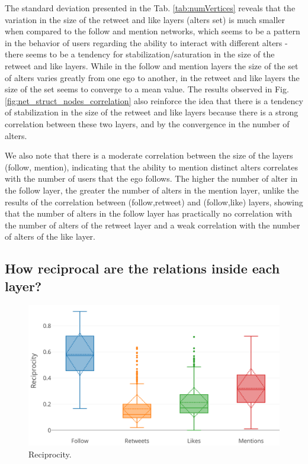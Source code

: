 The standard deviation presented in the Tab. \ref{tab:numVertices} reveals that the variation in the size of the retweet and like layers (alters set) is much smaller when compared to the follow and mention networks, which seems to be a pattern in the behavior of users regarding the ability to interact with different alters - there seems to be a tendency for stabilization/saturation in the size of the retweet and like layers. While in the follow and mention layers the size of the set of alters varies greatly from one ego to another, in the retweet and like layers the size of the set seems to converge to a mean value. The results observed in Fig. \ref{fig:net_struct_nodes_correlation} also reinforce the idea that there is a tendency of stabilization in the size of the retweet and like layers because there is a strong correlation between these two layers, and by the convergence in the number of alters.

We also note that there is a moderate correlation between the size of the layers (follow, mention), indicating that the ability to mention distinct alters correlates with the number of users that the ego follows. The higher the number of alter in the follow layer, the greater the number of alters in the mention layer, unlike the results of the correlation between (follow,retweet) and (follow,like) layers, showing that the number of alters in the follow layer has practically no correlation with the number of alters of the retweet layer and a weak correlation with the number of alters of the like layer. 



\subsection*{How reciprocal are the relations inside each layer?}
\label{subsec:reciprocity_result}
\begin{figure}[h!tb]
    \centering
    \includegraphics[width=1\textwidth]{fig/net_struct/reciprocity.png}
    \caption{Reciprocity.}
    \label{fig:net_struct_reciprocity}
\end{figure}

